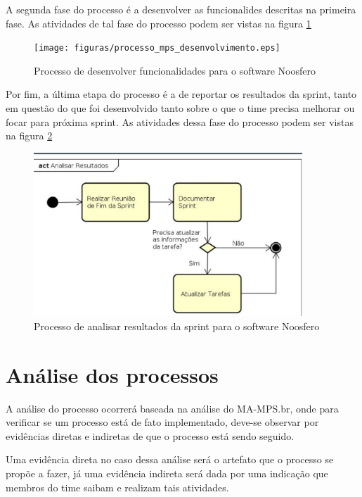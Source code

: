 \documentclass[a4paper, 11pt]{article}
\begin{document}
A segunda fase do processo é a desenvolver as funcionalides descritas na
primeira fase. As atividades de tal fase do processo podem ser vistas na figura
\ref{fig:processo_noosfero_desenvolvimento}

\begin{figure}[h]
  \centering
  \texttt{[image: figuras/processo\_mps\_desenvolvimento.eps]}
  \caption{Processo de desenvolver funcionalidades para o software Noosfero}
  \label{fig:processo_noosfero_desenvolvimento}
\end{figure}

Por fim, a última etapa do processo é a de reportar os resultados da sprint,
tanto em questão do que foi desenvolvido tanto sobre o que o time precisa
melhorar ou focar para próxima sprint. As atividades dessa fase do processo
podem ser vistas na figura \ref{fig:processo_noosfero_resultado}

\begin{figure}[h]
  \centering
  \includegraphics[width=0.9\textwidth]{figuras/processo_mps_resultados.eps}
  \caption{Processo de analisar resultados da sprint para o software Noosfero}
  \label{fig:processo_noosfero_resultado}
\end{figure}

\section*{Análise dos processos}

A análise do processo ocorrerá baseada na análise do MA-MPS.br, onde para
verificar se um processo está de fato implementado, deve-se observar por
evidências diretas e indiretas de que o processo está sendo seguido.

Uma evidência direta no caso dessa análise será o artefato que o processo se
propõe a fazer, já uma evidência indireta será dada por uma indicação que
membros do time saibam e realizam tais atividades.
\end{document}
